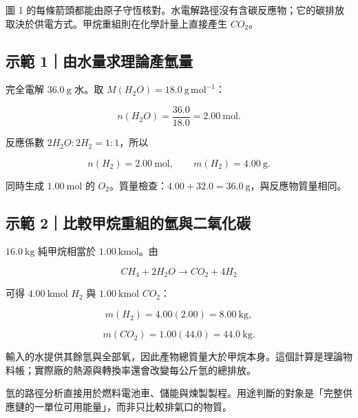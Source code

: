 \documentclass[11pt,a4paper]{article}
\begin{document}
圖 1 的每條箭頭都能由原子守恆核對。水電解路徑沒有含碳反應物；它的碳排放取決於供電方式。甲烷重組則在化學計量上直接產生 \(CO_2\)。

\begin{HandoutWorkedExample}

\subsection{示範 1｜由水量求理論產氫量}\label{ux793aux7bc4-1ux7531ux6c34ux91cfux6c42ux7406ux8ad6ux7522ux6c2bux91cf}

完全電解 \(36.0\ \mathrm{g}\) 水。取 \(M(H_2O)=18.0\ \mathrm{g\,mol^{-1}}\)：

\[
n(H_2O)=\frac{36.0}{18.0}=2.00\ \mathrm{mol}.
\]

反應係數 \(2H_2O:2H_2=1:1\)，所以

\[
n(H_2)=2.00\ \mathrm{mol},\qquad m(H_2)=4.00\ \mathrm{g}.
\]

同時生成 \(1.00\ \mathrm{mol}\) 的 \(O_2\)。質量檢查：\(4.00+32.0=36.0\ \mathrm{g}\)，與反應物質量相同。

\end{HandoutWorkedExample}

\begin{HandoutWorkedExample}

\subsection{示範 2｜比較甲烷重組的氫與二氧化碳}\label{ux793aux7bc4-2ux6bd4ux8f03ux7532ux70f7ux91cdux7d44ux7684ux6c2bux8207ux4e8cux6c27ux5316ux78b3}

\(16.0\ \mathrm{kg}\) 純甲烷相當於 \(1.00\ \mathrm{kmol}\)。由

\[
CH_4+2H_2O\rightarrow CO_2+4H_2
\]

可得 \(4.00\ \mathrm{kmol}\) \(H_2\) 與 \(1.00\ \mathrm{kmol}\) \(CO_2\)：

\[
m(H_2)=4.00(2.00)=8.00\ \mathrm{kg},
\]

\[
m(CO_2)=1.00(44.0)=44.0\ \mathrm{kg}.
\]

輸入的水提供其餘氫與全部氧，因此產物總質量大於甲烷本身。這個計算是理論物料帳；實際廠的熱源與轉換率還會改變每公斤氫的總排放。

\end{HandoutWorkedExample}

氫的路徑分析直接用於燃料電池車、儲能與煉製製程。用途判斷的對象是「完整供應鏈的一單位可用能量」，而非只比較排氣口的物質。
\end{document}
